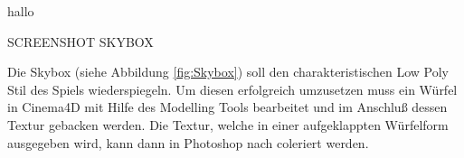 hallo



SCREENSHOT SKYBOX

Die Skybox (siehe Abbildung \ref{fig:Skybox}) soll den charakteristischen Low Poly Stil des Spiels wiederspiegeln. Um diesen erfolgreich umzusetzen muss ein Würfel in Cinema4D mit Hilfe des Modelling Tools bearbeitet und im Anschluß dessen Textur gebacken werden. Die Textur, welche in einer aufgeklappten Würfelform ausgegeben wird, kann dann in Photoshop nach coleriert werden.